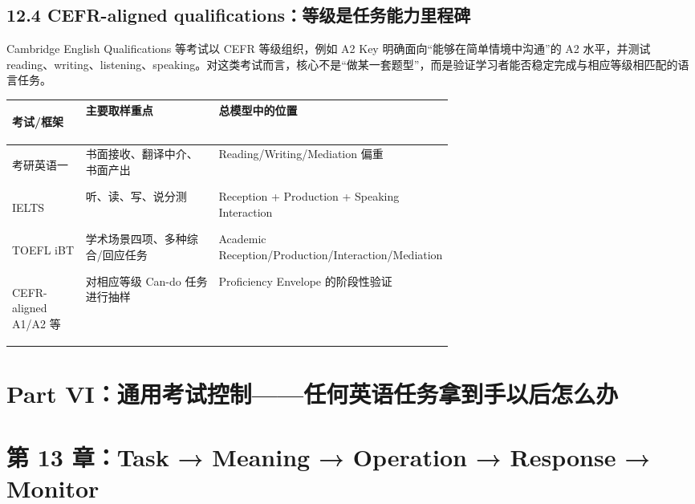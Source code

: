 \documentclass[11pt,a4paper]{ctexart}
\begin{document}
\subsection{12.4 CEFR-aligned qualifications：等级是任务能力里程碑}
Cambridge English Qualifications 等考试以 CEFR 等级组织，例如 A2 Key 明确面向“能够在简单情境中沟通”的 A2 水平，并测试 reading、writing、listening、speaking。对这类考试而言，核心不是“做某一套题型”，而是验证学习者能否稳定完成与相应等级相匹配的语言任务。

\begin{center}
\small
\begin{tabularx}{\linewidth}{>{\bfseries\raggedright\arraybackslash}p{0.20\linewidth} >{\raggedright\arraybackslash}p{0.44\linewidth} Y}
\toprule
考试/框架 & 主要取样重点 & 总模型中的位置 \\
\midrule
考研英语一 & 书面接收、翻译中介、书面产出 & Reading/Writing/Mediation 偏重 \\
IELTS & 听、读、写、说分测 & Reception + Production + Speaking Interaction \\
TOEFL iBT & 学术场景四项、多种综合/回应任务 & Academic Reception/Production/Interaction/Mediation \\
CEFR-aligned A1/A2 等 & 对相应等级 Can-do 任务进行抽样 & Proficiency Envelope 的阶段性验证 \\
\bottomrule
\end{tabularx}
\end{center}

\newpage
\section{Part VI：通用考试控制——任何英语任务拿到手以后怎么办}

\section{第 13 章：Task → Meaning → Operation → Response → Monitor}
\end{document}
